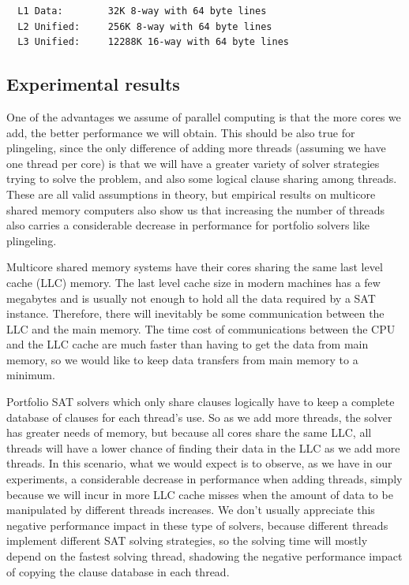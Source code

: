 \documentclass{llncs}
\begin{document}
\small
\begin{verbatim}
  L1 Data:        32K 8-way with 64 byte lines
  L2 Unified:     256K 8-way with 64 byte lines
  L3 Unified:     12288K 16-way with 64 byte lines
\end{verbatim}
\normalsize

\subsection{Experimental results}

One of the advantages we assume of parallel computing is that the more
cores we add, the better performance we will obtain. This should be
also true for plingeling, since the only difference of adding more
threads (assuming we have one thread per core) is that we will have a
greater variety of solver strategies trying to solve the problem, and
also some logical clause sharing among threads. These are all valid
assumptions in theory, but empirical results on multicore shared
memory computers also show us that increasing the number of threads
also carries a considerable decrease in performance for portfolio
solvers like plingeling.

Multicore shared memory systems have their cores sharing the same last
level cache (LLC) memory. The last level cache size in modern machines
has a few megabytes and is usually not enough to hold all the data
required by a SAT instance. Therefore, there will inevitably be some
communication between the LLC and the main memory. The time cost of
communications between the CPU and the LLC cache are much faster than
having to get the data from main memory, so we would like to keep data
transfers from main memory to a minimum.

Portfolio SAT solvers which only share clauses logically have to keep
a complete database of clauses for each thread's use. So as we add
more threads, the solver has greater needs of memory, but because all
cores share the same LLC, all threads will have a lower chance of
finding their data in the LLC as we add more threads. In this
scenario, what we would expect is to observe, as we have in our
experiments, a considerable decrease in performance when adding
threads, simply because we will incur in more LLC cache misses when
the amount of data to be manipulated by different threads
increases. We don't usually appreciate this negative performance
impact in these type of solvers, because different threads implement
different SAT solving strategies, so the solving time will mostly
depend on the fastest solving thread, shadowing the negative
performance impact of copying the clause database in each thread.
\end{document}
